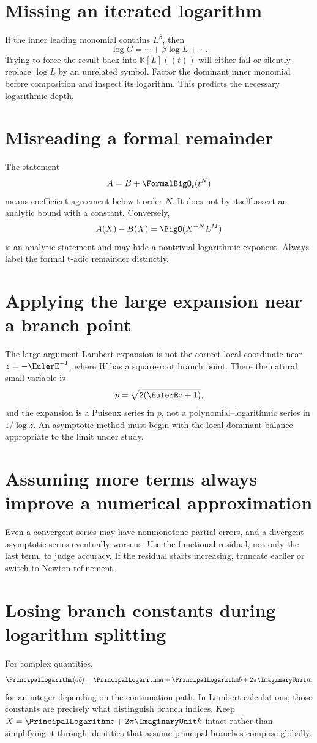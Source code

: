 \documentclass[11pt,openany]{book}
\theoremstyle{definition}
\theoremstyle{plain}
\theoremstyle{remark}
\newcommand{\K}{\mathbb{K}}
\begin{document}
\section{Missing an iterated logarithm}
If the inner leading monomial contains \(L^\beta\), then
\[
 \log G=\cdots+\beta\log L+\cdots.
\]
Trying to force the result back into \(\K[L]((t))\) will either fail or silently
replace \(\log L\) by an unrelated symbol.  Factor the dominant inner monomial
before composition and inspect its logarithm.  This predicts the necessary
logarithmic depth.

\section{Misreading a formal remainder}
The statement
\[
 A=B+\FormalBigO_t(t^N)
\]
means coefficient agreement below t-order \(N\).  It does not by itself assert
an analytic bound with a constant.  Conversely,
\[
 A(X)-B(X)=\BigO(X^{-N}L^M)
\]
is an analytic statement and may hide a nontrivial logarithmic exponent.
Always label the formal t-adic remainder distinctly.

\section{Applying the large expansion near a branch point}
The large-argument Lambert expansion is not the correct local coordinate near
\(z=-\EulerE^{-1}\), where \(W\) has a square-root branch point.  There the natural
small variable is
\[
 p=\sqrt{2(\EulerE z+1)},
\]
and the expansion is a Puiseux series in \(p\), not a polynomial--logarithmic
series in \(1/\log z\).  An asymptotic method must begin with the local dominant
balance appropriate to the limit under study.

\section{Assuming more terms always improve a numerical approximation}
Even a convergent series may have nonmonotone partial errors, and a divergent
asymptotic series eventually worsens.  Use the functional residual, not only
the last term, to judge accuracy.  If the residual starts increasing, truncate
earlier or switch to Newton refinement.

\section{Losing branch constants during logarithm splitting}
For complex quantities,
\[
 \PrincipalLogarithm(ab)=\PrincipalLogarithm a+\PrincipalLogarithm b+2\pi\ImaginaryUnit m
\]
for an integer depending on the continuation path.  In Lambert calculations,
those constants are precisely what distinguish branch indices.  Keep
\(X=\PrincipalLogarithm z+2\pi\ImaginaryUnit k\) intact rather than simplifying it through identities
that assume principal branches compose globally.
\end{document}
